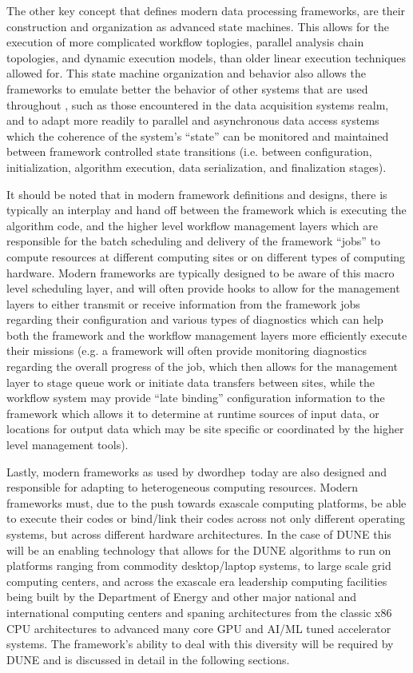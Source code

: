 \documentclass[../main-v1.tex]{subfiles}
\begin{document}
The other key concept that defines modern data processing frameworks, are their construction and organization as advanced state machines.  This allows for the execution of more complicated workflow toplogies, parallel analysis chain topologies, and dynamic execution models, than older linear execution techniques allowed for.  This state machine organization and behavior also allows the frameworks to emulate better the behavior of other systems that are used throughout  , such as those encountered in the data acquisition systems realm, and to adapt more readily to parallel and asynchronous data access systems which the coherence of the system's ``state'' can be monitored and maintained between framework controlled state transitions (i.e. between configuration, initialization, algorithm execution, data serialization, and finalization stages).  

It should be noted that in modern framework definitions and designs, there is typically an interplay and hand off between the framework which is executing the algorithm code, and the higher level workflow management layers which are responsible for the batch scheduling and delivery of the framework ``jobs'' to compute resources at different computing sites or on different types of computing hardware.  Modern frameworks are typically designed to be aware of this macro level scheduling layer, and will often provide hooks to allow for the management layers to either transmit or receive information from the framework jobs regarding their configuration and various types of diagnostics which can help both the framework and the workflow management layers more efficiently execute their missions (e.g. a framework will often provide monitoring diagnostics regarding the overall progress of the job, which then allows for the management layer to stage queue work or initiate data transfers between sites,  while the workflow system may provide ``late binding'' configuration information to the framework which allows it to determine at runtime sources of input data, or locations for output data which may be site specific or coordinated by the higher level management tools).

Lastly, modern frameworks as used by dword{hep}\ today are also designed and responsible for adapting to  heterogeneous computing resources.  Modern frameworks must, due to the push towards exascale computing platforms, be able to execute their codes or bind/link their codes across not only different operating systems, but across different hardware architectures.   In the case of DUNE this will be an enabling technology that allows for the DUNE algorithms to run on platforms ranging from commodity desktop/laptop systems, to large scale grid computing centers, and across the exascale era leadership computing facilities being built by the Department of Energy and other major national and international computing centers and spaning architectures from the classic x86 CPU architectures to advanced many core GPU and AI/ML tuned accelerator systems.  The framework's ability to deal with this diversity will be required by DUNE and is discussed in detail in the following sections.
\end{document}

